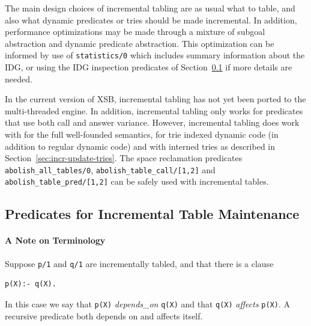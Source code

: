 The main design choices of incremental tabling
are as usual what to table, and also what dynamic predicates or tries
should be made incremental.  In addition, performance optimizations
may be made through a mixture of subgoal abstraction and dynamic
predicate abstraction.  This optimization can be informed by use of
{\tt statistics/0} which includes summary information about the IDG,
or using the IDG inspection predicates of
Section~\ref{sec:incr-preds1} if more details are needed.


In the current version of XSB, incremental tabling has not yet been
ported to the multi-threaded engine.  In addition, incremental tabling
only works for predicates that use both call and answer variance.
However, incremental tabling does work with for the full well-founded
semantics, for trie indexed dynamic code (in addition to regular
dynamic code) and with interned tries as described in
Section~\ref{sec:incr-update-tries}.  The space reclamation predicates
{\tt abolish\_all\_tables/0}, {\tt abolish\_table\_call/[1,2]} and
{\tt abolish\_table\_pred/[1,2]} can be safely used with incremental
tables.

\subsection{Predicates for Incremental Table Maintenance} \label{sec:incr-preds1}

\paragraph{A Note on Terminology}
%
Suppose {\tt p/1} and {\tt q/1} are incrementally tabled, and that
there is a clause
%
\begin{verbatim}
p(X):- q(X).
\end{verbatim}
%
In this case we say that {\tt p(X)} {\em depends\_on} {\tt q(X)} and
that {\tt q(X)} {\em affects} {\tt p(X)}.  A recursive predicate both
depends on and affects itself.


